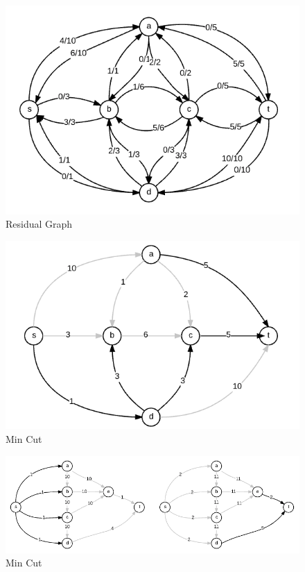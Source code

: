 \documentclass[11pt]{article}
\begin{document}
\begin{figure}[h!]
\begin{center}
\includegraphics[scale=0.4]{ResidualGraph.png}
\caption{Residual Graph}
\label{fig:residual}
\end{center}
\end{figure}

\begin{figure}[h!]
\begin{center}
\includegraphics[scale=0.4]{MinCutGraph.png}
\caption{Min Cut}
\label{fig:minCut}
\end{center}
\end{figure}

\begin{figure}[h!]
\begin{center}
\includegraphics[scale=0.4]{MinCutSwitch.png}
\caption{Min Cut}
\label{fig:minCutSwitch}
\end{center}
\end{figure}
\end{document}
